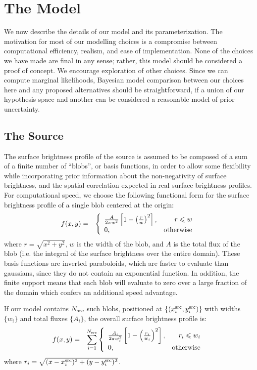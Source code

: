 \documentclass[useAMS,usenatbib]{mn2e}
\begin{document}
\section{The Model}
We now describe the details of our model and its parameterization. The
motivation for most of our modelling choices is a compromise between
computational efficiency, realism, and ease of implementation. None of the
choices we have made are final in any sense; rather, this model should be
considered a proof of concept. We encourage exploration of
other choices. Since we can compute marginal likelihoods, Bayesian model
comparison between our choices here and any proposed alternatives should be
straightforward, if a union of our hypothesis space and another
can be considered a reasonable model of prior uncertainty.

\subsection{The Source}
The surface brightness profile of the source is assumed to be composed of
a sum of a finite number of ``blobs'', or basis functions, in order to
allow some flexibility while incorporating prior information about the
non-negativity of surface brightness, and the spatial correlation expected
in real surface brightness profiles.
For computational speed, we choose the following
functional form for the surface brightness profile
of a single blob centered at the origin:
\begin{eqnarray}
f(x, y) &=& \left\{
\begin{array}{lr}
\frac{A}{2\pi w^2}\left[1 - \left(\frac{r}{w}\right)^2\right], & r \leq w\\
0, & \textnormal{otherwise}
\end{array}
\right.
\end{eqnarray}
where $r = \sqrt{x^2 + y^2}$, $w$ is the width of the blob, and $A$ is the
total flux of the blob (i.e. the integral of the surface brightness over the
entire domain).
These basis functions are inverted paraboloids, which are faster to evaluate
than gaussians, since they do not
contain an exponential function. In addition, the finite support means that
each blob will evaluate to zero over a large fraction of the domain which
confers an additional speed advantage.

If our model contains $N_{\rm src}$ such blobs, positioned at
$\left\{(x_i^{\rm src}, y_i^{\rm src})\right\}$ with widths $\{w_i\}$ and total fluxes
$\{A_i\}$, the overall surface brightness profile is:
\begin{eqnarray}
f(x, y) &=& \sum_{i=1}^{N_{\rm src}}\left\{
\begin{array}{lr}
\frac{A_i}{2\pi w_i^2}\left[1 - \left(\frac{r_i}{w_i}\right)^2\right], & r_i \leq w_i\\
0, & \textnormal{otherwise}
\end{array}
\right.
\end{eqnarray}
where $r_i = \sqrt{(x - x_i^{\rm src})^2 + (y - y_i^{\rm src})^2}$.
\end{document}

